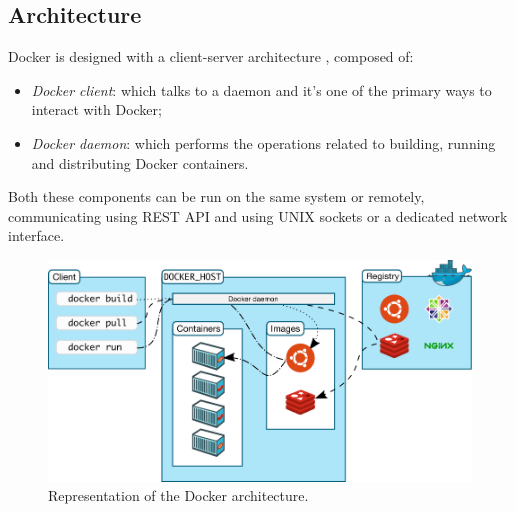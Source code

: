 \subsection{Architecture}
Docker is designed with a client-server architecture \cite{site:docker-overview}, composed of:
\begin{itemize}
	\item \textit{Docker client}: which talks to a daemon and it's one of the primary ways to interact with Docker;
	\item \textit{Docker daemon}: which performs the operations related to building, running and distributing Docker containers.
\end{itemize}
Both these components can be run on the same system or remotely, communicating using REST API and using UNIX sockets or a dedicated network interface.
\begin{figure}[h!]
	\centering
	\includegraphics[width=1\linewidth]{"immagini/Technologies/Docker architecture"}
	\caption[Representation of the Docker architecture.]{Representation of the Docker architecture.}
	\label{fig:docker-architecture}
\end{figure}


